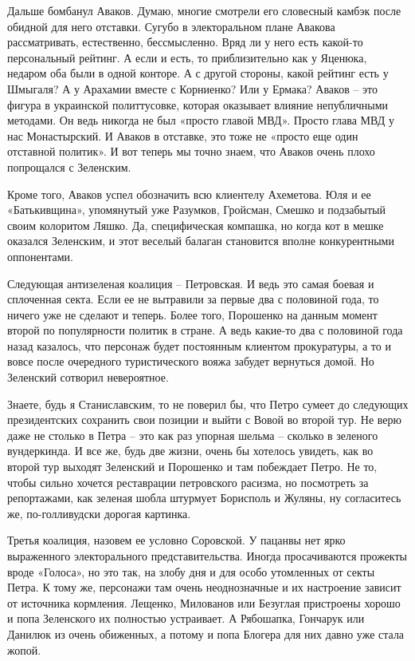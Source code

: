Дальше бомбанул Аваков. Думаю, многие смотрели его словесный камбэк после
обидной для него отставки. Сугубо в электоральном плане Авакова рассматривать,
естественно, бессмысленно. Вряд ли у него есть какой-то персональный рейтинг. А
если и есть, то приблизительно как у Яценюка, недаром оба были в одной конторе.
А с другой стороны, какой рейтинг есть у Шмыгаля? А у Арахамии вместе с
Корниенко? Или у Ермака? Аваков – это фигура в украинской политтусовке, которая
оказывает влияние непубличными методами. Он ведь никогда не был «просто главой
МВД». Просто глава МВД у нас Монастырский. И Аваков в отставке, это тоже не
«просто еще один отставной политик». И вот теперь мы точно знаем, что Аваков
очень плохо попрощался с Зеленским.

Кроме того, Аваков успел обозначить всю клиентелу Ахеметова. Юля и ее
«Батькивщина», упомянутый уже Разумков, Гройсман, Смешко и подзабытый своим
колоритом Ляшко. Да, специфическая компашка, но когда кот в мешке оказался
Зеленским, и этот веселый балаган становится вполне конкурентными оппонентами.

Следующая антизеленая коалиция – Петровская. И ведь это самая боевая и
сплоченная секта. Если ее не вытравили за первые два с половиной года, то
ничего уже не сделают и теперь. Более того, Порошенко на данным момент второй
по популярности политик в стране. А ведь какие-то два с половиной года назад
казалось, что персонаж будет постоянным клиентом прокуратуры, а то и вовсе
после очередного туристического вояжа забудет вернуться домой. Но Зеленский
сотворил невероятное.

Знаете, будь я Станиславским, то не поверил бы, что Петро сумеет до следующих
президентских сохранить свои позиции и выйти с Вовой во второй тур. Не верю
даже не столько в Петра – это как раз упорная шельма – сколько в зеленого
вундеркинда. И все же, будь две жизни, очень бы хотелось увидеть, как во второй
тур выходят Зеленский и Порошенко и там побеждает Петро. Не то, чтобы сильно
хочется реставрации петровского расизма, но посмотреть за репортажами, как
зеленая шобла штурмует Борисполь и Жуляны, ну согласитесь же, по-голливудски
дорогая картинка.

Третья коалиция, назовем ее условно Соровской. У пацанвы нет ярко выраженного
электорального представительства. Иногда просачиваются прожекты вроде «Голоса»,
но это так, на злобу дня и для особо утомленных от секты Петра. К тому же,
персонажи там очень неоднозначные и их настроение зависит от источника
кормления. Лещенко, Милованов или Безуглая пристроены хорошо и попа Зеленского
их полностью устраивает. А Рябошапка, Гончарук или Данилюк из очень обиженных,
а потому и попа Блогера для них давно уже стала жопой.

